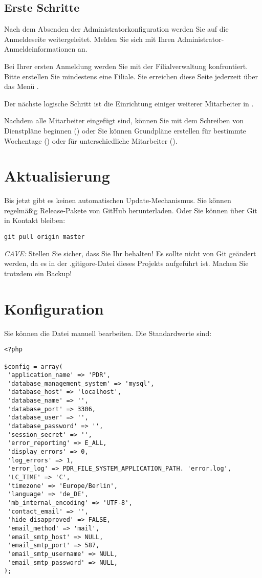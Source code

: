 \subsection {Erste Schritte} Nach dem Absenden der
Administratorkonfiguration werden Sie auf die Anmeldeseite
weitergeleitet. Melden Sie sich mit Ihren Administrator-Anmeldeinformationen
an.

Bei Ihrer ersten Anmeldung werden Sie mit der Filialverwaltung
konfrontiert. Bitte erstellen Sie mindestens eine Filiale. Sie erreichen
diese Seite jederzeit über das Menü .

Der nächste logische Schritt ist die Einrichtung einiger weiterer
Mitarbeiter in .

Nachdem alle Mitarbeiter eingefügt sind, können Sie mit dem Schreiben von
Dienstpläne beginnen () oder Sie
können Grundpläne erstellen für bestimmte Wochentage () oder für unterschiedliche Mitarbeiter
().


\section{Aktualisierung}
Bis jetzt gibt es keinen automatischen Update-Mechanismus. Sie können
regelmäßig Release-Pakete von GitHub herunterladen. Oder Sie können über Git
in Kontakt bleiben:
\begin{lstlisting}
git pull origin master
\end{lstlisting}
\emph{CAVE:} Stellen Sie sicher, dass Sie Ihr 
behalten! Es sollte nicht von Git geändert werden, da es in der
.gitigore-Datei dieses Projekts aufgeführt ist. Machen Sie trotzdem ein Backup!


\section{Konfiguration}
Sie können die Datei  manuell bearbeiten.  Die
Standardwerte sind:
\begin{lstlisting}
<?php

$config = array(
 'application_name' => 'PDR',
 'database_management_system' => 'mysql',
 'database_host' => 'localhost',
 'database_name' => '',
 'database_port' => 3306,
 'database_user' => '',
 'database_password' => '',
 'session_secret' => '',
 'error_reporting' => E_ALL,
 'display_errors' => 0,
 'log_errors' => 1,
 'error_log' => PDR_FILE_SYSTEM_APPLICATION_PATH. 'error.log',
 'LC_TIME' => 'C',
 'timezone' => 'Europe/Berlin',
 'language' => 'de_DE',
 'mb_internal_encoding' => 'UTF-8',
 'contact_email' => '',
 'hide_disapproved' => FALSE,
 'email_method' => 'mail',
 'email_smtp_host' => NULL,
 'email_smtp_port' => 587,
 'email_smtp_username' => NULL,
 'email_smtp_password' => NULL,
);
\end{lstlisting}


